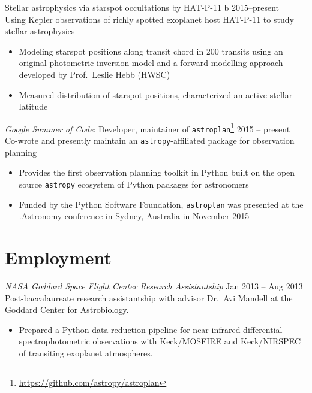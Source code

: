 \documentclass[margin]{res}
\begin{document}
\begin{resume}
Stellar astrophysics via starspot occultations by HAT-P-11 b   \hfill          2015--present\\
Using Kepler observations of richly spotted exoplanet host HAT-P-11 to study stellar astrophysics
 \begin{itemize}  \itemsep -2pt %
 \item Modeling starspot positions along transit chord in 200 transits using an original photometric inversion model and a forward modelling approach developed by Prof.\ Leslie Hebb (HWSC)
 \item Measured distribution of starspot positions,  characterized an active stellar latitude
 \end{itemize}  
             
{\sl Google Summer of Code}: Developer, maintainer of \texttt{astroplan}\footnote{\url{https://github.com/astropy/astroplan}} \hfill          2015 -- present\\
Co-wrote and presently maintain an \texttt{astropy}-affiliated package for observation planning 
 \begin{itemize}  \itemsep -1pt %
 \item Provides the first observation planning toolkit in Python built on the open source \texttt{astropy} ecosystem of Python packages for astronomers
 \item Funded by the Python Software Foundation, \texttt{astroplan} was presented
 at the .Astronomy conference in Sydney, Australia in November 2015\\
 \end{itemize}  

\section{Employment} 

{\sl NASA Goddard Space Flight Center Research Assistantship} \hfill           Jan 2013 -- Aug 2013\\
Post-baccalaureate research assistantship with advisor Dr.\ Avi Mandell at the Goddard Center for Astrobiology.
\begin{itemize}%
\item Prepared a Python data reduction pipeline for near-infrared differential spectrophotometric observations with Keck/MOSFIRE and Keck/NIRSPEC of transiting exoplanet atmospheres.\\
\end{itemize}  


\end{resume}
\end{document}
